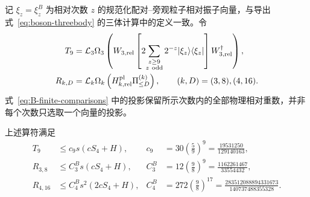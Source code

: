 \subsection{}
\label{sec:B-comparisons}

{记 $\xi_z=\xi_z^B$ 为相对次数 $z$ 的规范化配对--旁观粒子相对振子向量，与导出式~\eqref{eq:boson-threebody} 的三体计算中的定义一致。令}
\begin{align}
 T_9&=\mathcal L_3\Omega_3
 \left(W_{3,\rm rel}
   \left[2\!\sum_{\substack{z\ge9\\z\ {\rm odd}}}
        2^{-z}|\xi_z\rangle\langle\xi_z|\right]
       W_{3,\rm rel}^\dagger\right),
 \label{eq:B-tail-definition}\\
 R_{k,D}&=\mathcal L_k\Omega_k
       \left(H_{k,\rm rel}^{\rm pl}\Pi_{\le D}^{(k)}\right),
 \qquad (k,D)=(3,8),(4,16).
 \label{eq:B-finite-comparisons}
\end{align}
{式~\eqref{eq:B-finite-comparisons} 中的投影保留所示次数内的全部物理相对重数，并非每个次数只选取一个向量的投影。}

\begin{proposition}
\label{prop:B-comparisons}
{上述算符满足}
\begin{align}
 T_9&\le c_9s(cS_4+H),
 &c_9&=30\left(\frac59\right)^9
       =\frac{19531250}{129140163},
 \label{eq:B-tail-bound}\\
 R_{3,8}&\le C_3^B s(cS_4+H),
 &C_3^B&=12\left(\frac98\right)^9
       =\frac{1162261467}{33554432},
 \label{eq:B-R3-bound}\\
 R_{4,16}&\le C_4^B s^2(2cS_4+H),
 &C_4^B&=272\left(\frac98\right)^{17}
       =\frac{283512088894331673}{140737488355328}.
 \label{eq:B-R4-bound}
\end{align}
\end{proposition}

